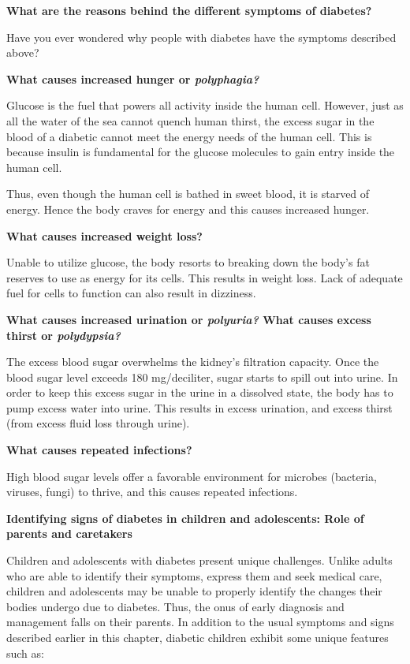 \noindent
\textbf{What are the reasons behind the different symptoms of diabetes?}

Have you ever wondered why people with diabetes have the symptoms described above?

\noindent
\textbf{What causes increased hunger or \textit{polyphagia?}}

Glucose is the fuel that powers all activity inside the human cell. However, just as all the water of the sea cannot quench human thirst, the excess sugar in the blood of a diabetic cannot meet the energy needs of the human cell. This is because insulin is fundamental for the glucose molecules to gain entry inside the human cell.

Thus, even though the human cell is bathed in sweet blood, it is starved of energy. Hence the body craves for energy and this causes increased hunger.

\noindent
\textbf{What causes increased weight loss?}

Unable to utilize glucose, the body resorts to breaking down the body’s fat reserves to use as energy for its cells. This results in weight loss. Lack of adequate fuel for cells to function can also result in dizziness.

\noindent
\textbf{What causes increased urination or \textit{polyuria?} What causes excess thirst or \textit{polydypsia?}}

The excess blood sugar overwhelms the kidney’s filtration capa\-city. Once the blood sugar level exceeds 180 mg/deciliter, sugar starts to spill out into urine. In order to keep this excess sugar in the urine in a dissolved state, the body has to pump excess water into urine. This results in excess urination, and excess thirst (from excess fluid loss through urine).

\noindent
\textbf{What causes repeated infections?}

High blood sugar levels offer a favorable environment for microbes (bacteria, viruses, fungi) to thrive, and this causes repeated infections.

\noindent
\textbf{Identifying signs of diabetes in children and adolescents: Role of parents and caretakers}

Children and adolescents with diabetes present unique challenges. Unlike adults who are able to identify their symptoms, express them and seek medical care, children and adolescents may be unable to pro\-perly identify the changes their bodies undergo due to diabetes. Thus, the onus of early diagnosis and management falls on their parents. In addition to the usual symptoms and signs described earlier in this chapter, diabetic children exhibit some unique features such as:

